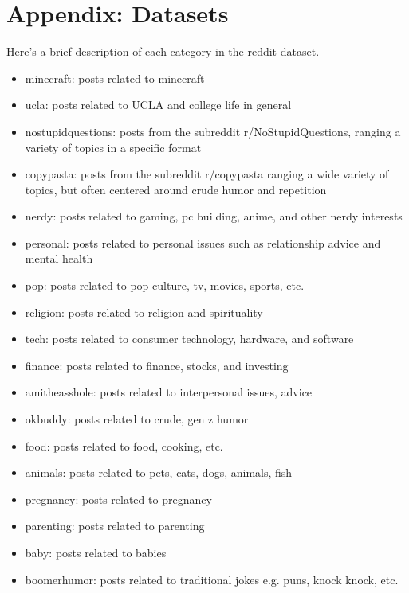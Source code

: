 \documentclass[11pt]{article}
\begin{document}
\clearpage

\section{Appendix: Datasets}
\label{sec:appendix}

Here's a brief description of each category in the reddit dataset. 

\begin{itemize}
    \item minecraft: posts related to minecraft
    \item ucla: posts related to UCLA and college life in general
    \item nostupidquestions: posts from the subreddit r/NoStupidQuestions, ranging a variety of topics in a specific format
    \item copypasta: posts from the subreddit r/copypasta ranging a wide variety of topics, but often centered around crude humor and repetition
    \item nerdy: posts related to gaming, pc building, anime, and other nerdy interests
    \item personal: posts related to personal issues such as relationship advice and mental health        
    \item pop: posts related to pop culture, tv, movies, sports, etc.
    \item religion: posts related to religion and spirituality
    \item tech: posts related to consumer technology, hardware, and software
    \item finance: posts related to finance, stocks, and investing
    \item amitheasshole: posts related to interpersonal issues, advice
    \item okbuddy: posts related to crude, gen z humor
    \item food: posts related to food, cooking, etc.
    \item animals: posts related to pets, cats, dogs, animals, fish
    \item pregnancy: posts related to pregnancy
    \item parenting: posts related to parenting
    \item baby: posts related to babies
    \item boomerhumor: posts related to traditional jokes e.g. puns, knock knock, etc.
\end{itemize}
\end{document}
